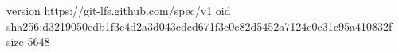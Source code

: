 version https://git-lfs.github.com/spec/v1
oid sha256:d3219050cdb1f3c4d2a3d043cdcd671f3c0e82d5452a7124e0e31c95a410832f
size 5648
